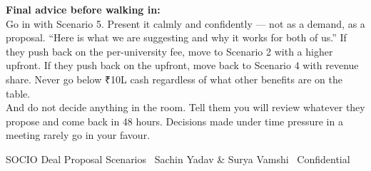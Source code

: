 \documentclass[12pt,a4paper]{article}
\begin{document}
    \vspace{1cm}

    \begin{recommendbox}
    \textbf{Final advice before walking in:}\\[0.4cm]
    Go in with Scenario 5. Present it calmly and confidently — not as a demand, as a proposal. ``Here is what we are suggesting and why it works for both of us.'' If they push back on the per-university fee, move to Scenario 2 with a higher upfront. If they push back on the upfront, move back to Scenario 4 with revenue share. Never go below ₹10L cash regardless of what other benefits are on the table.\\[0.3cm]
    And do not decide anything in the room. Tell them you will review whatever they propose and come back in 48 hours. Decisions made under time pressure in a meeting rarely go in your favour.
    \end{recommendbox}

    \vspace{1.5cm}
    \begin{center}
    {\small\color{darkgray} SOCIO Deal Proposal Scenarios \textbullet\ Sachin Yadav \& Surya Vamshi \textbullet\ Confidential}
    \end{center}

    
\end{document}
